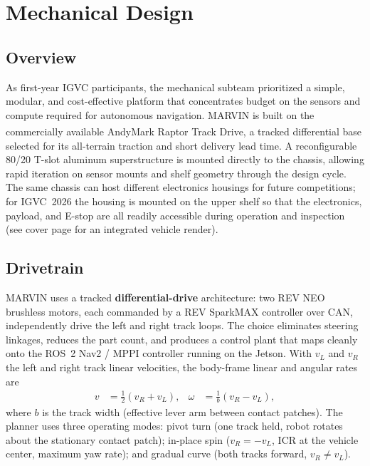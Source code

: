 \documentclass[12pt, letterpaper]{article}
\newcommand{\robotname}{MARVIN}
\begin{document}
\section{Mechanical Design}
\label{sec:mechanical}

\subsection{Overview}

As first-year IGVC participants, the mechanical subteam prioritized a simple, modular,
and cost-effective platform that concentrates budget on the sensors and compute
required for autonomous navigation. \robotname{} is built on the commercially available
AndyMark\textsuperscript{\textregistered} Raptor Track Drive, a tracked differential
base selected for its all-terrain traction and short delivery lead time. A reconfigurable
80/20 T-slot aluminum superstructure is mounted directly to the chassis, allowing rapid
iteration on sensor mounts and shelf geometry through the design cycle. The same chassis
can host different electronics housings for future competitions; for IGVC~2026 the
housing is mounted on the upper shelf so that the electronics, payload, and E-stop are
all readily accessible during operation and inspection (see cover page for an
integrated vehicle render).

\subsection{Drivetrain}

\robotname{} uses a tracked \textbf{differential-drive} architecture: two REV NEO
brushless motors, each commanded by a REV SparkMAX controller over CAN, independently
drive the left and right track loops. The choice eliminates steering linkages, reduces
the part count, and produces a control plant that maps cleanly onto the ROS~2 Nav2 / MPPI
controller running on the Jetson. With $v_L$ and $v_R$ the left and right track linear
velocities, the body-frame linear and angular rates are
\begin{align}
    v &= \tfrac{1}{2}(v_R + v_L), &
    \omega &= \tfrac{1}{b}(v_R - v_L),
\end{align}
where $b$ is the track width (effective lever arm between contact patches). The planner
uses three operating modes: pivot turn (one track held, robot rotates about the
stationary contact patch); in-place spin ($v_R = -v_L$, ICR at the vehicle center,
maximum yaw rate); and gradual curve (both tracks forward, $v_R \neq v_L$).
\end{document}
